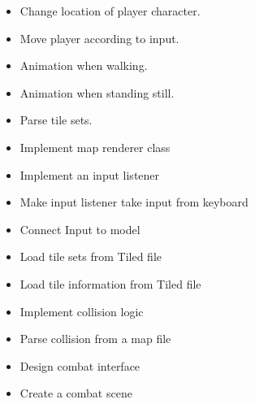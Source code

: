 {\begin{itemize}[+]
	\item Change location of player character.
	\item Move player according to input.
	\item Animation when walking.
	\item Animation when standing still.
\end{itemize}}
{\begin{itemize}[+]
	\item Parse tile sets.
	\item Implement map renderer class
\end{itemize}}
{\begin{itemize}[+]
	\item Implement an input listener
	\item Make input listener take input from keyboard
	\item Connect Input to model
\end{itemize}}
{\begin{itemize}[+]
	\item Load tile sets from Tiled file
	\item Load tile information from Tiled file
\end{itemize}}
{\begin{itemize}[+]
	\item Implement collision logic
	\item Parse collision from a map file
\end{itemize}}
{\begin{itemize}[+]
	\item Design combat interface
	\item Create a combat scene
\end{itemize}
}
